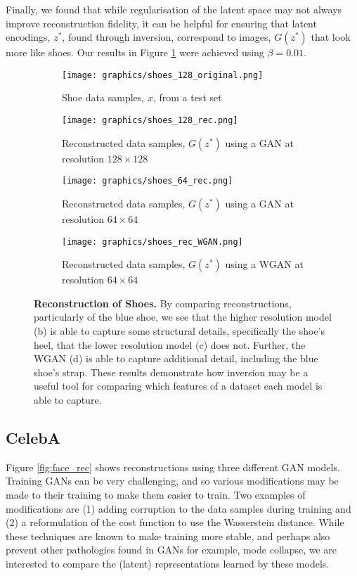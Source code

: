 \documentclass[journal]{IEEEtran}
\begin{document}
Finally, we found that while regularisation of the latent space may not always improve reconstruction fidelity, it can be helpful for ensuring that latent encodings, $z^*$, found through inversion, correspond to images, $G(z^*)$ that look more like shoes. Our results in Figure \ref{fig:shoes_rec} were achieved using $\beta=0.01$.

\begin{figure}[h]
    \begin{subfigure}{\columnwidth}
        \texttt{[image: graphics/shoes\_128\_original.png]}
        \caption{Shoe data samples, $x$, from a test set}
    \end{subfigure}
    \begin{subfigure}{\columnwidth}
        \texttt{[image: graphics/shoes\_128\_rec.png]}
        \caption{Reconstructed data samples, $G(z^*)$ using a GAN at resolution $128\times128$}
    \end{subfigure}
    \begin{subfigure}{\columnwidth}
        \texttt{[image: graphics/shoes\_64\_rec.png]}
        \caption{Reconstructed data samples, $G(z^*)$ using a GAN at resolution $64\times64$}
    \end{subfigure}
    \begin{subfigure}{\columnwidth}
        \texttt{[image: graphics/shoes\_rec\_WGAN.png]} %
        \caption{Reconstructed data samples, $G(z^*)$ using a WGAN at resolution $64\times64$}
    \end{subfigure}
    \caption{\textbf{Reconstruction of Shoes.} By comparing reconstructions, particularly of the blue shoe, we see that the higher resolution model (b) is able to capture some structural details, specifically the shoe's heel, that the lower resolution model (c) does not. Further, the WGAN (d) is able to capture additional detail, including the blue shoe's strap. These results demonstrate how inversion may be a useful tool for comparing which features of a dataset each model is able to capture.}
    \label{fig:shoes_rec}
\end{figure}


\subsection{CelebA}

Figure \ref{fig:face_rec} shows reconstructions using three different GAN models. Training GANs can be very challenging, and so various modifications may be made to their training to make them easier to train. Two examples of modifications are (1) adding corruption to the data samples during training \cite{arjovsky2017towards} and (2) a reformulation of the cost function to use the Wasserstein distance. While these techniques are known to make training more stable, and perhaps also prevent other pathologies found in GANs for example, mode collapse, we are interested to compare the (latent) representations learned by these models.
\end{document}
